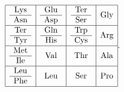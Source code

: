 {

$$

\begin{array}{|c|c|c|c|}

\hline \begin{array}{c} {\rm Lys}  \cr \hline{\rm Asn}

\end{array}  & \begin{array}{c}

{\rm Glu}  \cr \hline{\rm Asp}

\end{array}  & \begin{array}{c}

{\rm Ter}  \cr \hline{\rm Ser}

\end{array}  & {\rm Gly}\cr





\hline\begin{array}{c} {\rm Ter}  \cr \hline{\rm Tyr}

\end{array}  & \begin{array}{c}

{\rm Gln}  \cr \hline{\rm His}

\end{array}  & \begin{array}{c} {\rm Trp}  \cr

\hline{\rm Cys}

\end{array}  & {\rm Arg}\cr



\hline \begin{array}{c} {\rm Met}  \cr \hline{\rm Ile}

\end{array}

 & {\rm Val} & {\rm Thr} & {\rm Ala}    \cr

\hline

\begin{array}{c}

{\rm Leu}  \cr \hline{\rm Phe}

\end{array}



 & {\rm Leu}  & {\rm Ser}

 & {\rm Pro} \cr \hline

\end{array}.

$$

}



